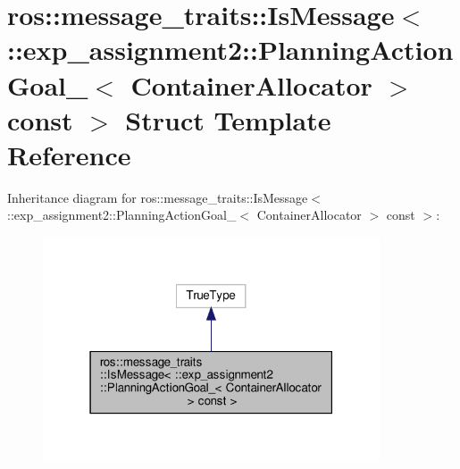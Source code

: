 \hypertarget{structros_1_1message__traits_1_1IsMessage_3_01_1_1exp__assignment2_1_1PlanningActionGoal___3_01C8cbfe9f0f7d6fe386c456912e903c9b6}{}\section{ros\+:\+:message\+\_\+traits\+:\+:Is\+Message$<$ \+:\+:exp\+\_\+assignment2\+:\+:Planning\+Action\+Goal\+\_\+$<$ Container\+Allocator $>$ const $>$ Struct Template Reference}
\label{structros_1_1message__traits_1_1IsMessage_3_01_1_1exp__assignment2_1_1PlanningActionGoal___3_01C8cbfe9f0f7d6fe386c456912e903c9b6}


Inheritance diagram for ros\+:\+:message\+\_\+traits\+:\+:Is\+Message$<$ \+:\+:exp\+\_\+assignment2\+:\+:Planning\+Action\+Goal\+\_\+$<$ Container\+Allocator $>$ const $>$\+:
\nopagebreak
\begin{figure}[H]
\begin{center}
\leavevmode
\includegraphics[width=283pt]{structros_1_1message__traits_1_1IsMessage_3_01_1_1exp__assignment2_1_1PlanningActionGoal___3_01C2450114942953b904027ee6de3b2df6a}
\end{center}
\end{figure}


